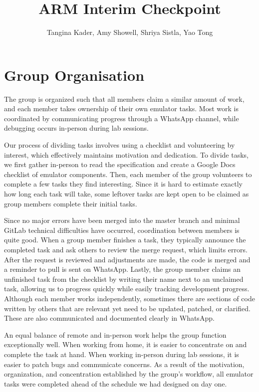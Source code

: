 \documentclass[11pt]{article}
\begin{document}
\title{ARM Interim Checkpoint}
\author{Tangina Kader, Amy Showell, Shriya Sistla, Yao Tong}

\maketitle

\section{Group Organisation}

The group is organized such that all members claim a similar amount of work, 
and each member takes ownership of their own emulator tasks. Most work is coordinated 
by communicating progress through a WhatsApp channel, while debugging  
occurs in-person during lab sessions. 

Our process of dividing tasks involves using a checklist and volunteering by interest, which effectively
maintains motivation and dedication. To divide tasks, we first gather in-person 
to read the specification and create a Google Docs checklist of emulator components. Then, 
each member of the group volunteers to complete a few tasks they find interesting. Since 
it is hard to estimate exactly how long each task will take, some leftover tasks are kept 
open to be claimed as group members complete their initial tasks. 

Since no major errors have been merged into the master branch and minimal GitLab technical 
difficulties have occurred, coordination between members is quite good. When a group member 
finishes a task, they typically announce the completed task and ask others to 
review the merge request, which limits errors. After the request is reviewed and adjustments are made, the code 
is merged and a reminder to pull is sent on WhatsApp. Lastly, the group member claims an 
unfinished task from the checklist by writing their name next to an unclaimed task, allowing 
us to progress quickly while easily tracking development progress. Although each member works independently, sometimes 
there are sections of code written by others that are relevant yet need to be updated, patched, 
or clarified. These are also communicated and documented clearly in WhatsApp. 

An equal balance of remote and in-person work helps the group function exceptionally well. 
When working from home, it is easier to concentrate on and complete the task at hand. 
When working in-person during lab sessions, it is easier to patch bugs and communicate concerns. 
As a result of the motivation, organization, and concentration established by the group’s workflow, all 
emulator tasks were completed ahead of the schedule we had designed on day one. 
\end{document}
